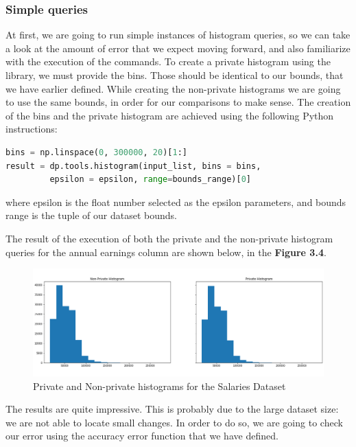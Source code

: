 \subsubsection{Simple queries}

At first, we are going to run simple instances of histogram queries, so we can take a look at the amount of error that we expect moving forward, and also familiarize with the execution of the commands. To create a private histogram using the library, we must provide the bins. Those should be identical to our bounds, that we have earlier defined. While creating the non-private histograms we are going to use the same bounds, in order for our comparisons to make sense. The creation of the bins and the private histogram are achieved using the following Python instructions:

\bigskip
\begin{lstlisting}[basicstyle= \footnotesize,
language=Python]
bins = np.linspace(0, 300000, 20)[1:]
result = dp.tools.histogram(input_list, bins = bins, 
         epsilon = epsilon, range=bounds_range)[0]
\end{lstlisting}
\bigskip

where epsilon is the float number selected as the epsilon parameters, and bounds range is the tuple of our dataset bounds.

The result of the execution of both the private and the non-private histogram queries for the annual earnings column are shown below, in the \textbf{Figure 3.4}.

\begin{figure}[!htb]\centering
    \includegraphics[width=1\textwidth]{images/simple_hists.png}
    \caption{Private and Non-private histograms for the Salaries Dataset}
\end{figure}

The results are quite impressive. This is probably due to the large dataset size: we are not able to locate small changes. In order to do so, we are going to check our error using the accuracy error function that we have defined.

